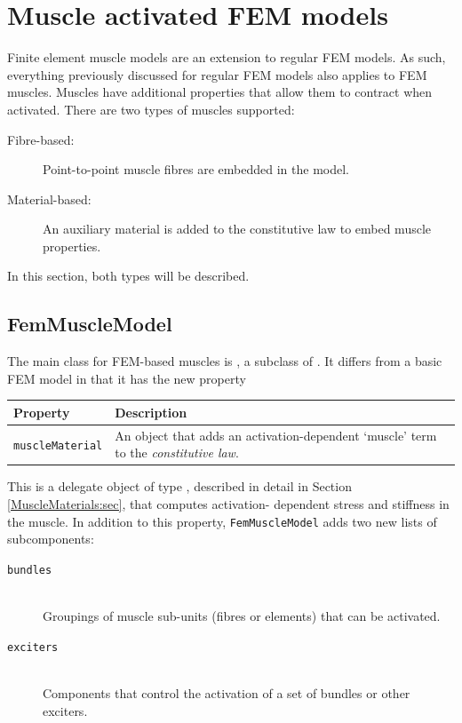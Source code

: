 \section{Muscle activated FEM models}
\label{sec:fem:muscle}

Finite element muscle models are an extension to regular FEM models.  As such,
everything previously discussed for regular FEM models also applies to FEM
muscles.  Muscles have additional properties that allow them to contract when 
activated.  There are two types of muscles supported:
\begin{description}
\item[Fibre-based:] Point-to-point muscle fibres are embedded in the model.
\item[Material-based:] An auxiliary material is added to the constitutive law
    to embed muscle properties. 
\end{description}
In this section, both types will be described.

\subsection{FemMuscleModel}
\label{FemMuscleModel:sec}

The main class for FEM-based muscles is 
, a subclass 
of .  It differs from a basic
FEM model in that it has the new property
\begin{center}
	\begin{tabular}{|ll|}
		\hline
		Property & Description\\
		\hline
		{\tt muscleMaterial} & An object that adds an activation-dependent
		                       `muscle' term to the \emph{constitutive law}.\\
		\hline
	\end{tabular}
\end{center}
This is a delegate object of type 
, described
in detail in Section \ref{MuscleMaterials:sec}, that computes activation-%
dependent stress and stiffness in the muscle. 
In addition to this property, 
{\tt FemMuscleModel} adds two new lists of subcomponents:
\begin{description}
   \item[{\tt bundles}]\mbox{}\\
   Groupings of muscle sub-units (fibres or elements) that can be activated.

   \item[{\tt exciters}]\mbox{}\\
   Components that control the activation of a set of bundles or other exciters.
\end{description}

